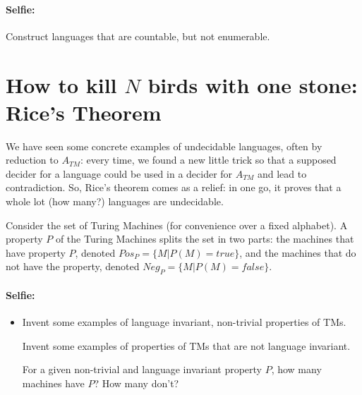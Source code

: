\paragraph{Selfie:} Construct languages that are countable, but not enumerable.

\section{How to kill $N$ birds with one stone: Rice's Theorem}

We have seen some concrete examples of undecidable languages, often by
reduction to $A_{TM}$: every time, we found a new little trick so that
a supposed decider for a language could be used in a decider for
$A_{TM}$ and lead to contradiction. So, Rice's theorem comes as a
relief: in one go, it proves that a whole lot (how many?) languages
are undecidable.

Consider the set of Turing Machines (for convenience over a fixed
alphabet). A property $P$ of the Turing Machines splits the set in two
parts: the machines that have property $P$, denoted
%
$Pos_P = \{M|P(M) = true\}$, and the machines that do not have the
property, denoted
%
$Neg_P = \{M|P(M) = false\}$.



\paragraph{Selfie:}
\begin{itemize}
\item[]
Invent some examples of language invariant, non-trivial
properties of TMs.

Invent some examples of properties of TMs that are not language
invariant.

For a given non-trivial and language invariant property $P$, how many
machines have $P$? How many don't?
\end{itemize}

